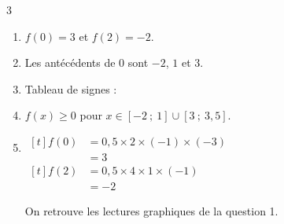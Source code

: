 \documentclass[10pt,a4paper]{article}
\begin{document}
\begin{corr}{3}
\begin{enumerate}[leftmargin=*]
    \item \(f(0)=3\) et \(f(2)=-2\).
    \item Les antécédents de \(0\) sont \(-2\), \(1\) et \(3\).
    \item Tableau de signes :
    \begin{center}
    \end{center}
    \item \(f(x)\geq 0\) pour \(x\in[-2\ ;\ 1]\cup[3\ ;\ 3,5]\).
    \item \(\begin{aligned}[t] f(0)&=0,5\times 2\times(-1)\times(-3)\\ &=3\end{aligned}\) \qquad \(\begin{aligned}[t] f(2)&=0,5\times 4\times 1\times(-1)\\ &=-2\end{aligned}\)

    On retrouve les lectures graphiques de la question 1.
\end{enumerate}
\end{corr}
\end{document}
